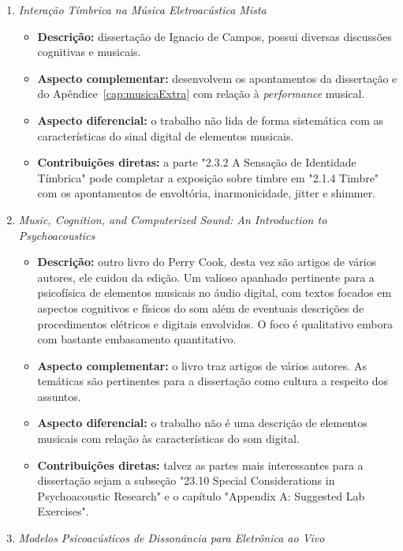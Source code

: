 \begin{enumerate}
    \item \emph{Interação Tímbrica na Música Eletroacústica Mista}
        \begin{itemize}
            \item {\bf Descrição:} dissertação de Ignacio de Campos, possui diversas discussões cognitivas e musicais.
            \item {\bf Aspecto complementar:} desenvolvem os apontamentos da dissertação e do Apêndice~\ref{cap:musicaExtra} com relação à \emph{performance} musical.
            \item {\bf Aspecto diferencial:} o trabalho não lida de forma sistemática com as características do sinal digital de elementos musicais.
            \item {\bf Contribuições diretas:} a parte "2.3.2 A Sensação de Identidade Tímbrica" pode completar a exposição sobre timbre em "2.1.4 Timbre" com os apontamentos de envoltória, inarmonicidade, jitter e shimmer.
        \end{itemize}
    \item \emph{Music, Cognition, and Computerized Sound: An Introduction to Psychoacoustics}
        \begin{itemize}
            \item {\bf Descrição:} outro livro do Perry Cook, desta vez são artigos de vários autores, ele cuidou da edição. Um valioso apanhado pertinente para a psicofísica de elementos musicais no áudio digital, com textos focados em aspectos cognitivos e físicos do som além de eventuais descrições de procedimentos elétricos e digitais envolvidos. O foco é qualitativo embora com bastante embasamento quantitativo.
            \item {\bf Aspecto complementar:} o livro traz artigos de vários autores. As temáticas são pertinentes para a dissertação como cultura a respeito dos assuntos.
            \item {\bf Aspecto diferencial:} o trabalho não é uma descrição de elementos musicais com relação às características do som digital.
            \item {\bf Contribuições diretas:} talvez as partes mais interessantes para a dissertação sejam a subseção "23.10 Special Considerations in Psychoacoustic Research" e o capítulo "Appendix A: Suggested Lab Exercises".
        \end{itemize}
    \item \emph{Modelos Psicoacústicos de Dissonância para Eletrônica ao Vivo}
        \begin{itemize}

\end{itemize}
\end{enumerate}
